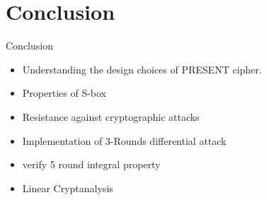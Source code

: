 \section{Conclusion}

\begin{frame}{Conclusion}
   \begin{itemize}
    \item Understanding the design choices of PRESENT cipher. 
    \item Properties of S-box
    \item Resistance against cryptographic attacks
    \item Implementation of 3-Rounds differential attack
    \item verify 5 round integral property 
    \item Linear Cryptanalysis
\end{itemize}

\end{frame}

